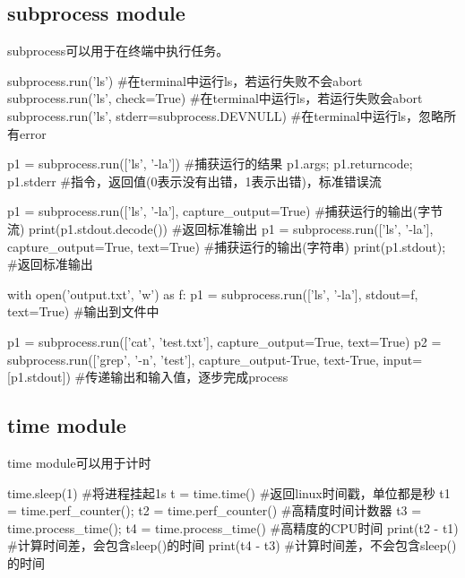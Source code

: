   \subsection{subprocess module}
    subprocess可以用于在终端中执行任务。
    \begin{codeblock}[language=python, caption={subprocess module}]
      subprocess.run('ls') #在terminal中运行ls，若运行失败不会abort
      subprocess.run('ls', check=True) #在terminal中运行ls，若运行失败会abort
      subprocess.run('ls', stderr=subprocess.DEVNULL) #在terminal中运行ls，忽略所有error

      p1 = subprocess.run(['ls', '-la']) #捕获运行的结果
      p1.args; p1.returncode; p1.stderr #指令，返回值(0表示没有出错，1表示出错)，标准错误流

      p1 = subprocess.run(['ls', '-la'], capture_output=True) #捕获运行的输出(字节流)
      print(p1.stdout.decode()) #返回标准输出
      p1 = subprocess.run(['ls', '-la'], capture_output=True, text=True) 
          #捕获运行的输出(字符串)
      print(p1.stdout); #返回标准输出

      with open('output.txt', 'w') as f:
          p1 = subprocess.run(['ls', '-la'], stdout=f, text=True) #输出到文件中

      p1 = subprocess.run(['cat', 'test.txt'], capture_output=True, text=True)
      p2 = subprocess.run(['grep', '-n', 'test'], capture_output-True, 
                          text-True, input=[p1.stdout])
      #传递输出和输入值，逐步完成process
    \end{codeblock}

  \subsection{time module}
    time module可以用于计时
    \begin{codeblock}[language=python, caption={time module}]
      time.sleep(1) #将进程挂起1s
      t = time.time() #返回linux时间戳，单位都是秒
      t1 = time.perf_counter(); t2 = time.perf_counter() #高精度时间计数器
      t3 = time.process_time(); t4 = time.process_time() #高精度的CPU时间
      print(t2 - t1) #计算时间差，会包含sleep()的时间
      print(t4 - t3) #计算时间差，不会包含sleep()的时间
    \end{codeblock}

